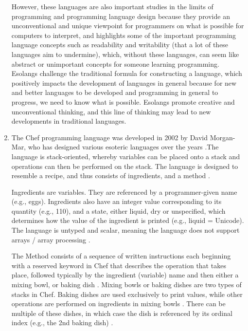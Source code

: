 \documentclass{article}
\begin{document}
\begin{enumerate}
    However, these languages are also important studies in the limits of programming and programming language design because they provide an unconventional and unique viewpoint for programmers on what is possible for computers to interpret, and highlights some of the important programming language concepts such as readability and writability (that a lot of these languages aim to undermine), which, without these languages, can seem like abstract or unimportant concepts for someone learning programming. Esolangs challenge the traditional formula for constructing a language, which positively impacts the development of languages in general because for new and better languages to be developed and programming in general to progress, we need to know what is possible. Esolangs promote creative and unconventional thinking, and this line of thinking may lead to new developments in traditional languages. \\

    \item The Chef programming language was developed in 2002 by David Morgan-Mar, who has designed various esoteric languages over the years \cite{Esolang_2021}.The language is stack-oriented, whereby variables can be placed onto a stack and operations can then be performed on the stack. The language is designed to resemble a recipe, and thus consists of ingredients, and a method \cite{Progopedia_2011}.
    
    Ingredients are variables. They are referenced by a programmer-given name (e.g., eggs). Ingredients also have an integer value corresponding to its quantity (e.g., 110), and a state, either liquid, dry or unspecified, which determines how the value of the ingredient is printed (e.g., liquid = Unicode). The language is untyped and scalar, meaning the language does not support arrays / array processing \cite{Progopedia_2011}.
    
    The Method consists of a sequence of written instructions each beginning with a reserved keyword in Chef that describes the operation that takes place, followed typically by the ingredient (variable) name and then either a mixing bowl, or baking dish \cite{Progopedia_2011}. Mixing bowls or baking dishes are two types of stacks in Chef. Baking dishes are used exclusively to print values, while other operations are performed on ingredients in mixing bowls \cite{Progopedia_2011}. There can be multiple of these dishes, in which case the dish is referenced by its ordinal index (e.g., the 2nd baking dish) \cite{Progopedia_2011}.
    

\end{enumerate}
\end{document}
